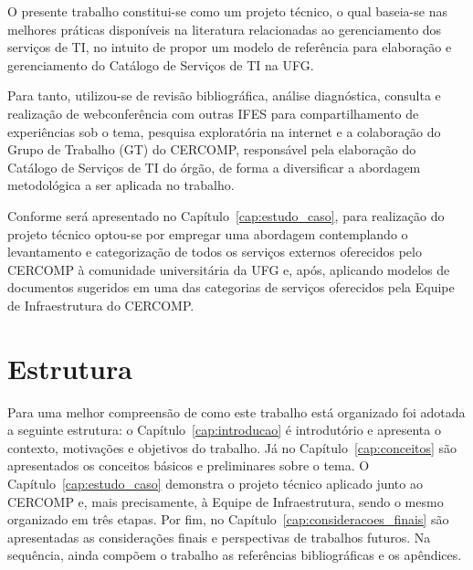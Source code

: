 O presente trabalho constitui-se como um projeto técnico, o qual baseia-se nas melhores práticas disponíveis na literatura relacionadas ao gerenciamento dos serviços de TI, no intuito de propor um modelo de referência para elaboração e gerenciamento do Catálogo de Serviços de TI na UFG.

Para tanto, utilizou-se de revisão bibliográfica, análise diagnóstica, consulta e realização de webconferência com outras IFES para compartilhamento de experiências sob o tema, pesquisa exploratória na internet e a colaboração do Grupo de Trabalho (GT) do CERCOMP, responsável pela elaboração do Catálogo de Serviços de TI do órgão, de forma a diversificar a abordagem metodológica a ser aplicada no trabalho.

Conforme será apresentado no Capítulo~\ref{cap:estudo_caso}, para realização do projeto técnico optou-se por empregar uma abordagem contemplando o levantamento e categorização de todos os serviços externos oferecidos pelo CERCOMP à comunidade universitária da UFG e, após, aplicando modelos de documentos sugeridos em uma das categorias de serviços oferecidos pela Equipe de Infraestrutura do CERCOMP.


\section{Estrutura}
\label{sec:estrutura}

Para uma melhor compreensão de como este trabalho está organizado foi adotada a seguinte estrutura: o Capítulo~\ref{cap:introducao} é introdutório e apresenta o contexto, motivações e objetivos do trabalho.
Já no Capítulo~\ref{cap:conceitos} são apresentados os conceitos básicos e preliminares sobre o tema.
O Capítulo~\ref{cap:estudo_caso} demonstra o projeto técnico aplicado junto ao CERCOMP e, mais precisamente, à Equipe de Infraestrutura, sendo o mesmo organizado em três etapas.
Por fim, no Capítulo~\ref{cap:consideracoes_finais} são apresentadas as considerações finais e perspectivas de trabalhos futuros.
Na sequência, ainda compõem o trabalho as referências bibliográficas e os apêndices.
